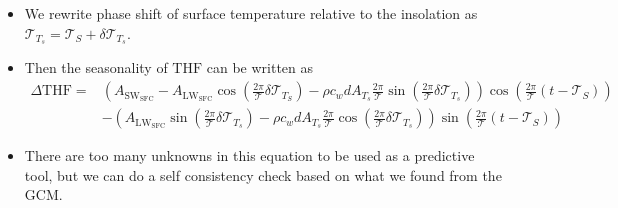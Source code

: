 \documentclass{ametsocV5}
\begin{document}
\begin{itemize}
          \item We rewrite phase shift of surface temperature relative to the insolation as $\mathscr{T}_{T_{s}}=\mathscr{T}_{S}+\delta\mathscr{T}_{T_{s}}$.
          \item Then the seasonality of $\mathrm{THF}$ can be written as
                \begin{equation} \label{eq:thf-full}
                  \begin{aligned}
                    \Delta \mathrm{THF} =& \left( A_{\mathrm{SW_{SFC}}} - A_{\mathrm{LW_{SFC}}}\cos\left(\frac{2\pi}{\mathcal{T}}\delta\mathscr{T}_{T_{S}}\right) - \rho c_{w} d A_{T_{s}}\frac{2\pi}{\mathcal{T}}\sin\left(\frac{2\pi}{\mathcal{T}}\delta\mathscr{T}_{T_{s}}\right) \right) \cos\left(\frac{2\pi}{\mathcal{T}}(t-\mathscr{T}_{S})\right) \\
                    &- \left(A_{\mathrm{LW_{SFC}}}\sin\left(\frac{2\pi}{\mathcal{T}}\delta\mathscr{T}_{T_{s}}\right) - \rho c_{w}d A_{T_{s}}\frac{2\pi}{\mathcal{T}}\cos\left(\frac{2\pi}{\mathcal{T}}\delta\mathscr{T}_{T_{s}}\right) \right)\sin\left(\frac{2\pi}{\mathcal{T}}(t-\mathscr{T}_{S})\right)
                  \end{aligned}
                \end{equation}
          \item There are too many unknowns in this equation to be used as a predictive tool, but we can do a self consistency check based on what we found from the GCM.
        \end{itemize}
\end{document}
